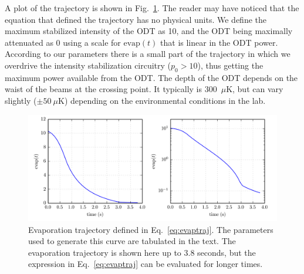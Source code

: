 A plot of the trajectory is shown in Fig.~\ref{fig:evap-traj}.  The reader may
have noticed that the equation that defined the trajectory has no physical
units.   We define the maximum stabilized intensity of the ODT as 10, and the
ODT being maximally attenuated as 0 using a scale for $\text{evap}(t)$ that is
linear in the ODT power.   According to our parameters there is a small part of
the trajectory in which we overdrive the intensity stabilization circuitry
($p_{0}>10$), thus getting the maximum power available from the ODT.  The depth
of the ODT depends on the waist of the beams at the crossing point.  It
typically is 300~$\mu$K, but can vary slightly ($\pm50~\mu$K) depending on the
environmental conditions in the lab. 
\begin{figure}
    \centering
\includegraphics[width=\textwidth]{../figures/evap/evap_traj.png}
\caption{\small Evaporation trajectory defined in Eq.~\ref{eq:evaptraj}. The
parameters used to generate this curve are tabulated in the text. The
evaporation trajectory is shown here up to 3.8 seconds, but the expression in
Eq.~\ref{eq:evaptraj} can be evaluated for longer times. }
\label{fig:evap-traj}
\end{figure}

